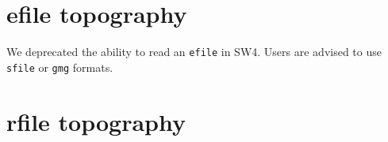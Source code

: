 \documentclass[11pt]{report}
\begin{document}
{\section{efile topography}\label{sec:topo-efile}
We deprecated the ability to read an \verb+efile+ in SW4. Users are advised to use \verb+sfile+ or \verb+gmg+ formats.


\section{rfile topography}\label{sec:topo-rfile}

}
\end{document}
